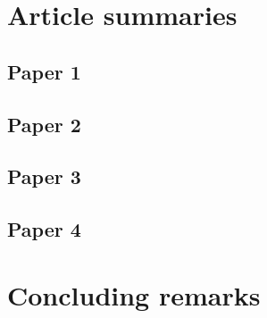 \documentclass[12pt]{article}
\begin{document}
\section{Article summaries} \label{Article summaries}

\subsection{Paper 1} \label{Paper 1}

\subsection{Paper 2} \label{Paper 2}

\subsection{Paper 3} \label{Paper 3}

\subsection{Paper 4} \label{Paper 4}

\section{Concluding remarks} \label{Concluding remarks}

\pagebreak



\end{document}
